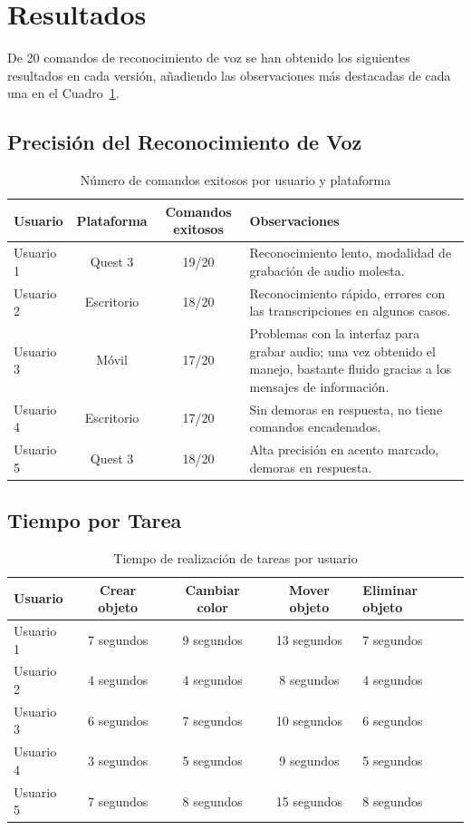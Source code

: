 \documentclass[a4paper, 12pt]{book}
\begin{document}
\section{Resultados}
De 20 comandos de reconocimiento de voz se han obtenido los siguientes resultados en cada versión, añadiendo las observaciones más destacadas de cada una en el Cuadro~\ref{tab:precision_comandos}.
\subsection{Precisión del Reconocimiento de Voz}
\begin{table}[H]
\centering
\begin{tabular}{|l|c|c|p{6cm}|}
\hline
\textbf{Usuario} & \textbf{Plataforma} & \textbf{Comandos exitosos} & \textbf{Observaciones} \\
\hline
Usuario 1 & Quest 3 & 19/20 & Reconocimiento lento, modalidad de grabación de audio molesta. \\
\hline
Usuario 2 & Escritorio & 18/20 & Reconocimiento rápido, errores con las transcripciones en algunos casos. \\
\hline
Usuario 3 & Móvil & 17/20 & Problemas con la interfaz para grabar audio; una vez obtenido el manejo, bastante fluido gracias a los mensajes de información. \\
\hline
Usuario 4 & Escritorio & 17/20 & Sin demoras en respuesta, no tiene comandos encadenados. \\
\hline
Usuario 5 & Quest 3 & 18/20 & Alta precisión en acento marcado, demoras en respuesta. \\
\hline
\end{tabular}
\caption{Número de comandos exitosos por usuario y plataforma}
\label{tab:precision_comandos}
\end{table}

\subsection{Tiempo por Tarea}

\begin{table}[H]
\centering
\begin{tabular}{|l|c|c|c|p{3cm}|}
\hline
\textbf{Usuario} & \textbf{Crear objeto} & \textbf{Cambiar color} & \textbf{Mover objeto} & \textbf{Eliminar objeto} \\
\hline
Usuario 1 & 7 segundos & 9 segundos & 13 segundos & 7 segundos\\
\hline
Usuario 2 & 4 segundos & 4 segundos & 8 segundos & 4 segundos\\
\hline
Usuario 3 & 6 segundos & 7 segundos & 10 segundos & 6 segundos\\
\hline
Usuario 4 & 3 segundos & 5 segundos & 9 segundos & 5 segundos\\
\hline
Usuario 5 & 7 segundos & 8 segundos & 15 segundos & 8 segundos\\
\hline
\end{tabular}
\caption{Tiempo de realización de tareas por usuario}
\label{tab:precision_tarea}
\end{table}
\end{document}

